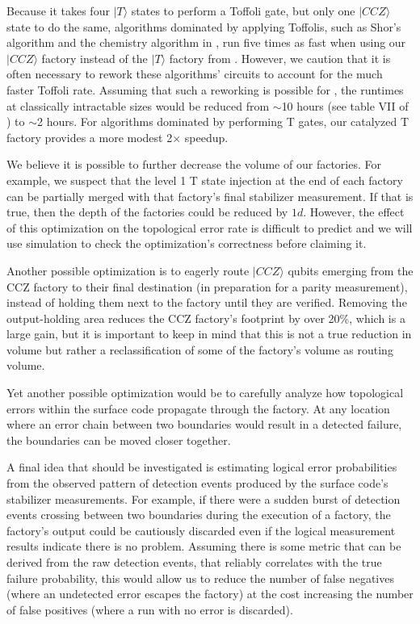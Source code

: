 \documentclass[twocolumn,accepted=2019-03-30]{quantumarticle}
\begin{document}
Because it takes four $|T\rangle$ states to perform a Toffoli gate, but only one $|CCZ\rangle$ state to do the same, algorithms dominated by applying Toffolis, such as Shor's algorithm and the chemistry algorithm in \cite{babbush2018}, run five times as fast when using our $|CCZ\rangle$ factory instead of the $|T\rangle$ factory from \cite{fowler2018}.
However, we caution that it is often necessary to rework these algorithms' circuits to account for the much faster Toffoli rate.
Assuming that such a reworking is possible for \cite{babbush2018}, the runtimes at classically intractable sizes would be reduced from $\sim$10 hours (see table VII of \cite{babbush2018}) to $\sim$2 hours.
For algorithms dominated by performing T gates, our catalyzed T factory provides a more modest 2$\times$ speedup.

We believe it is possible to further decrease the volume of our factories.
For example, we suspect that the level 1 T state injection at the end of each factory can be partially merged with that factory's final stabilizer measurement.
If that is true, then the depth of the factories could be reduced by $1d$.
However, the effect of this optimization on the topological error rate is difficult to predict and we will use simulation to check the optimization's correctness before claiming it.

Another possible optimization is to eagerly route $|CCZ\rangle$ qubits emerging from the CCZ factory to their final destination (in preparation for a parity measurement), instead of holding them next to the factory until they are verified.
Removing the output-holding area reduces the CCZ factory's footprint by over 20\%, which is a large gain, but it is important to keep in mind that this is not a true reduction in volume but rather a reclassification of some of the factory's volume as routing volume.

Yet another possible optimization would be to carefully analyze how topological errors within the surface code propagate through the factory.
At any location where an error chain between two boundaries would result in a detected failure, the boundaries can be moved closer together.

A final idea that should be investigated is estimating logical error probabilities from the observed pattern of detection events produced by the surface code's stabilizer measurements.
For example, if there were a sudden burst of detection events crossing between two boundaries during the execution of a factory, the factory's output could be cautiously discarded even if the logical measurement results indicate there is no problem.
Assuming there is some metric that can be derived from the raw detection events, that reliably correlates with the true failure probability, this would allow us to reduce the number of false negatives (where an undetected error escapes the factory) at the cost increasing the number of false positives (where a run with no error is discarded).
\end{document}
